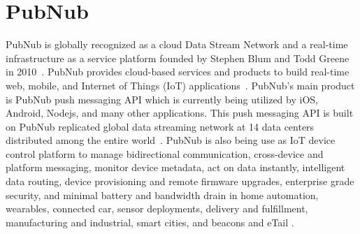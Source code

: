 \section{PubNub}

PubNub is globally recognized as a cloud Data Stream Network and a real-time
infrastructure as a service platform founded by Stephen Blum and Todd Greene in
2010~\cite{ hid-sp18-409-www-pubnub}. PubNub provides cloud-based services and
products to build real-time web, mobile, and Internet of Things (IoT)
applications~\cite{ hid-sp18-409-www-pubnub-wikipedia}. PubNub's main product is
PubNub push messaging API which is currently being utilized by iOS, Android,
Nodejs, and many other applications.  This push messaging API is built on PubNub
replicated global data streaming network at 14 data centers distributed among
the entire world~\cite{hid-sp18-409-www-pubnub-wikipedia}.  PubNub is also being
use as IoT device control platform to manage bidirectional communication,
cross-device and platform messaging, monitor device metadata, act on data
instantly, intelligent data routing, device provisioning and remote firmware
upgrades, enterprise grade security, and minimal battery and bandwidth drain in
home automation, wearables, connected car, sensor deployments, delivery and
fulfillment, manufacturing and industrial, smart cities, and beacons and eTail
\cite{hid-sp18-409-www-pubnub}.
